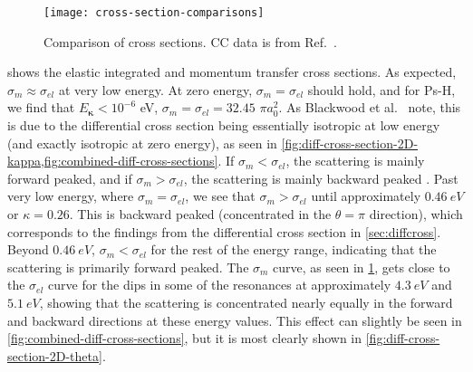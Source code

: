 \documentclass[Dissertation.tex]{subfiles}
\begin{document}
%
%

\begin{figure}
	\centering
	\texttt{[image: cross-section-comparisons]}
	\caption{Comparison of cross sections. CC data is from Ref.~\cite{Walters2004}.}
	\label{fig:cross-section-comparisons}
\end{figure}

 shows the elastic integrated and momentum
transfer cross sections.
As expected, $\sigma_m \approx \sigma_{el}$ at very low energy. 
At zero energy, $\sigma_m = \sigma_{el}$ should hold, and for Ps-H, we find that
$E_{\bm \kappa} < 10^{-6}$ eV, $\sigma_m = \sigma_{el} = 32.45$ $\pi a_0^2$. 
As Blackwood et al.\ \cite{Blackwood2002c} note, this is due to the differential
cross section being essentially isotropic at low energy (and exactly isotropic at
zero energy), as seen in
\cref{fig:diff-cross-section-2D-kappa,fig:combined-diff-cross-sections}.
If $\sigma_m < \sigma_{el}$, the scattering is mainly forward peaked, and if
$\sigma_m > \sigma_{el}$, the scattering is mainly backward peaked \cite{Thumm1993}.
Past very low energy, where $\sigma_m = \sigma_{el}$, we see that $\sigma_m > \sigma_{el}$
until approximately $\SI{0.46}{eV}$ or $\kappa = 0.26$. This is backward peaked
(concentrated in the $\theta = \pi$ direction), which corresponds to the
findings from the differential cross section in \cref{sec:diffcross}. Beyond
$\SI{0.46}{eV}$, $\sigma_m < \sigma_{el}$ for the rest of the energy range,
indicating that the scattering is primarily forward peaked. The $\sigma_m$ curve,
as seen in \cref{fig:cross-section-comparisons}, gets close to the $\sigma_{el}$
curve for the dips in some of the resonances at approximately $\SI{4.3}{eV}$
and $\SI{5.1}{eV}$, showing that the scattering is concentrated nearly equally
in the forward and backward directions at these energy values.
This effect can slightly be seen in \cref{fig:combined-diff-cross-sections},
but it is most clearly shown in \cref{fig:diff-cross-section-2D-theta}.
\end{document}
